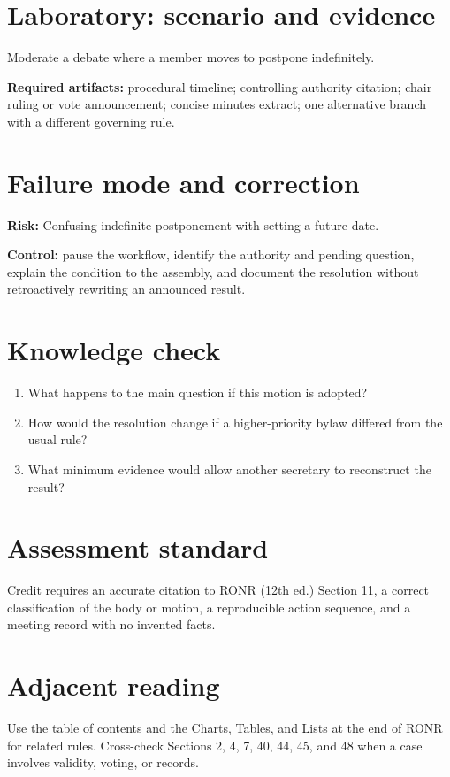 \documentclass[11pt]{article}
\begin{document}
\section{Laboratory: scenario and evidence}
Moderate a debate where a member moves to postpone indefinitely.

\textbf{Required artifacts:} procedural timeline; controlling authority citation; chair ruling or vote announcement; concise minutes extract; one alternative branch with a different governing rule.

\section{Failure mode and correction}
\textbf{Risk:} Confusing indefinite postponement with setting a future date.

\textbf{Control:} pause the workflow, identify the authority and pending question, explain the condition to the assembly, and document the resolution without retroactively rewriting an announced result.

\section{Knowledge check}
\begin{enumerate}[leftmargin=*,itemsep=4pt]
\item What happens to the main question if this motion is adopted?
\item How would the resolution change if a higher-priority bylaw differed from the usual rule?
\item What minimum evidence would allow another secretary to reconstruct the result?
\end{enumerate}

\section{Assessment standard}
Credit requires an accurate citation to RONR (12th ed.) Section 11, a correct classification of the body or motion, a reproducible action sequence, and a meeting record with no invented facts.

\section{Adjacent reading}
Use the table of contents and the Charts, Tables, and Lists at the end of RONR for related rules. Cross-check Sections 2, 4, 7, 40, 44, 45, and 48 when a case involves validity, voting, or records.
\end{document}
